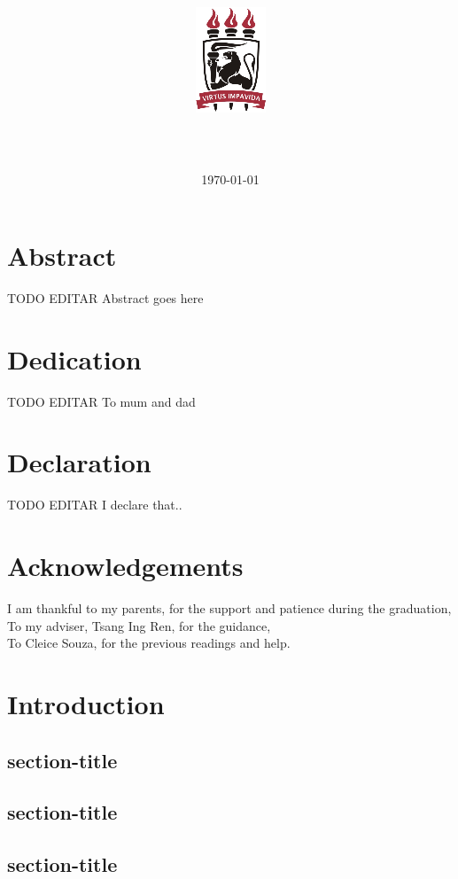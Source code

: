 \documentclass[12pt,twoside]{report}
\title{
    {\includegraphics{ufpelogo.png}}
    \\
    {\large \universityname}
    \\
    {\large \centername}
    \vfill
    \textbf{\papertitle}
    \vfill
}
\author{\authorname}
\date{\normalsize\vfill \today}%
\begin{document}
\maketitle



\chapter*{Abstract}
TODO EDITAR Abstract goes here

\chapter*{Dedication}
TODO EDITAR To mum and dad

\chapter*{Declaration}
TODO EDITAR I declare that..

\chapter*{Acknowledgements}
I am thankful to my parents, for the support and patience during the graduation,
\\To my adviser, Tsang Ing Ren, for the guidance,
\\To Cleice Souza, for the previous readings and help.

\tableofcontents



\chapter{Introduction}

\blindtext
\section{section-title}
\blindtext[3]
\section{section-title}
\blindtext[3]


\blindtext[2]\autocite{stevenb.davispaulmermelstein1980}
\section{section-title}
\blindtext[3]
\end{document}
